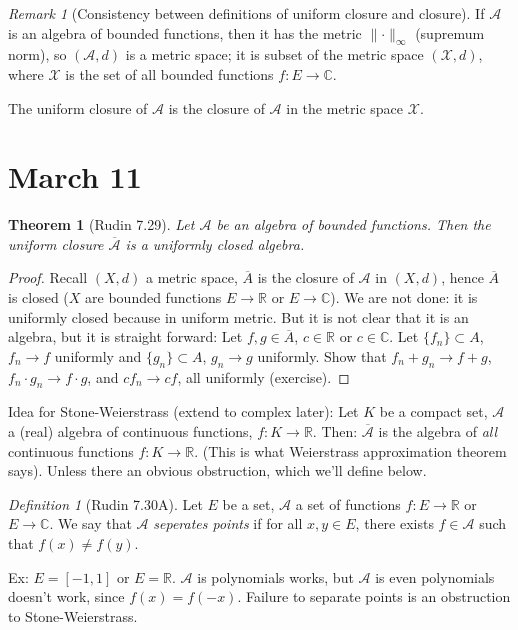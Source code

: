 \documentclass{article}
\theoremstyle{plain}
\newtheorem{theorem}{Theorem}
\theoremstyle{remark}
\newtheorem{definition}{Definition}
\newtheorem{remark}{Remark}
\newcommand{\R}{{\mathbb R}}
\newcommand{\C}{{\mathbb C}}
\begin{document}
\begin{remark}[Consistency between definitions of uniform closure and closure]
	If $\mathcal{A}$ is an algebra of bounded functions,
	then it has the metric $\lVert \cdot \rVert_\infty$ (supremum norm),
	so $(\mathcal{A},d)$ is a metric space;
	it is subset of the metric space $(\mathcal{X},d)$,
	where $\mathcal{X}$ is the set of all bounded functions $f \colon E \to \C$.
\end{remark}
The uniform closure of $\mathcal{A}$ is the closure of $\mathcal{A}$
in the metric space $\mathcal{X}$.


\section{March 11}
\begin{theorem}[Rudin 7.29]
	Let $\mathcal{A}$ be an algebra of bounded functions.
	Then the uniform closure $\overline{\mathcal{A}}$
	is a uniformly closed algebra.
\end{theorem}
\begin{proof}
	Recall $(X,d)$ a metric space, $\overline{A}$ is the closure
	of $\mathcal{A}$ in $(X,d)$, hence $\overline{A}$ is closed
	($X$ are bounded functions $E \to \R$ or $E \to \C$).
	We are not done: it is uniformly closed because in uniform metric.
	But it is not clear that it is an algebra, but it is straight forward:
	Let $f,g \in \overline{A}$, $c \in \R$ or $c \in \C$.
	Let $\{f_n\} \subset A$, $f_n \to f$ uniformly and $\{g_n\} \subset A$,
	$g_n \to g$ uniformly.
	Show that $f_n + g_n \to f + g$, $f_n \cdot g_n \to f \cdot g$,
	and $cf_n \to cf$, all uniformly
	(exercise).
\end{proof}
Idea for Stone-Weierstrass (extend to complex later):
Let $K$ be a compact set, $\mathcal{A}$ a (real) algebra of continuous functions,
$f \colon K \to \R$.
Then: $\overline{\mathcal{A}}$ is the algebra of \emph{all} continuous functions
$f \colon K \to \R$.
(This is what Weierstrass approximation theorem says).
Unless there an obvious obstruction, which we'll define below.

\begin{definition}[Rudin 7.30A]
	Let $E$ be a set, $\mathcal{A}$ a set of functions
	$f \colon E \to \R$ or $E \to \C$.
	We say that $\mathcal{A}$ \emph{seperates points}
	if for all $x,y \in E$, there exists $f \in \mathcal{A}$ such that $f(x) \neq f(y)$.
\end{definition}
Ex: $E = [-1,1]$ or $E = \R$.
$\mathcal{A}$ is polynomials works, but $\mathcal{A}$ is even polynomials doesn't work,
since $f(x) = f(-x)$.
Failure to separate points is an obstruction to Stone-Weierstrass.
\end{document}
